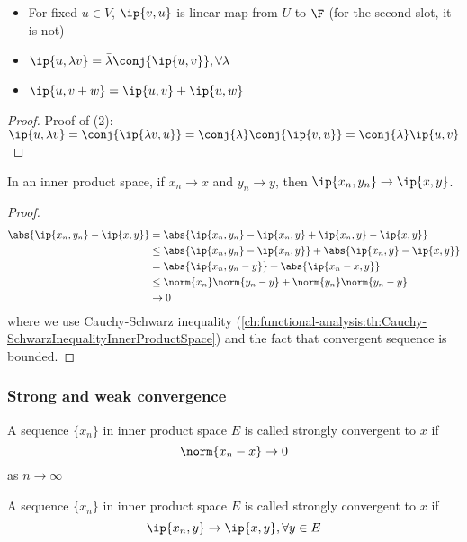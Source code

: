 \begin{refsection}
\begin{lemma}\hfill
	\begin{itemize}
		\item For fixed $u\in V$, $\ip{v,u}$ is linear map from $U$ to $\F$ (for the second slot, it is not)
		\item $\ip{u,\lambda v} = \bar{\lambda}\conj{\ip{u,v}},\forall \lambda $
		\item $\ip{u,v+w} = \ip{u,v} + \ip{u,w}$
	\end{itemize}
\end{lemma}
\begin{proof}
	Proof of (2): $\ip{u,\lambda v} = \conj{\ip{\lambda v,u}} = \conj{\lambda}\conj{\ip{v,u}} = \conj{\lambda}\ip{u, v}$
\end{proof}

\begin{lemma}
	In an inner product space, if $x_n\to x$ and $y_n\to y$, then $\ip{x_n,y_n}\to \ip{x,y}$.
\end{lemma}
\begin{proof}
	\begin{align*}
	\abs{\ip{x_n,y_n}-\ip{x,y}}&=\abs{\ip{x_n,y_n}-\ip{x_n,y}+\ip{x_n,y}-\ip{x,y}}\\& \leq \abs{\ip{x_n,y_n}-\ip{x_n,y}}+\abs{\ip{x_n,y}-\ip{x,y}} \\
	& = \abs{\ip{x_n,y_n - y}}+\abs{\ip{x_n - x,y}} \\
	& \leq \norm{x_n}\norm{y_n-y}+\norm{y_n}\norm{y_n-y} \\
	&  \to 0   
	\end{align*}
	where we use Cauchy-Schwarz inequality (\autoref{ch:functional-analysis:th:Cauchy-SchwarzInequalityInnerProductSpace}) and the fact that convergent sequence is bounded.	
\end{proof}




\subsubsection{Strong and weak convergence}
\begin{definition}
	\cite[98]{debnath2005hilbert}
	A sequence $\{x_n\}$ in inner product space $E$ is called strongly convergent to $x$ if
	$$\norm{x_n-x}\to 0$$
	as $n\to \infty$
\end{definition}


\begin{definition}
	\cite[98]{debnath2005hilbert}A sequence $\{x_n\}$ in inner product space $E$ is called strongly convergent to $x$ if
	$$\ip{x_n,y} \to \ip{x,y}, \forall y \in E$$
\end{definition}



\end{refsection}
